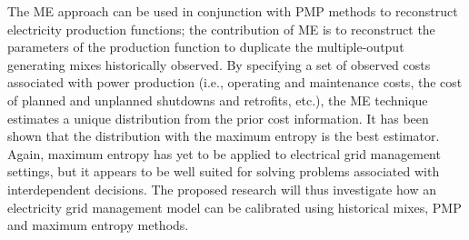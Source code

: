 The ME approach can be used in conjunction with PMP methods to
reconstruct electricity production functions; the contribution of ME is
to reconstruct the parameters of the production function to duplicate
the multiple-output generating mixes historically observed. By
specifying a set of observed costs associated with power production
(i.e., operating and maintenance costs, the cost of planned and
unplanned shutdowns and retrofits, etc.), the ME technique estimates a
unique distribution from the prior cost information. It has been shown
that the distribution with the maximum entropy is the best estimator.
Again, maximum entropy has yet to be applied to electrical grid
management settings, but it appears to be well suited for solving
problems associated with interdependent decisions. The proposed research
will thus investigate how an electricity grid management model can be
calibrated using historical mixes, PMP and maximum entropy methods.


\setlength{\unitlength}{\savedunitlength}